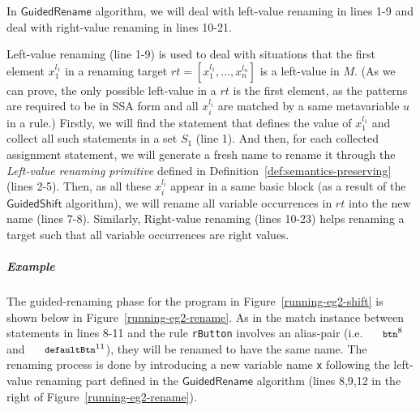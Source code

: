 \documentclass[letterpaper, USenglish]{lipics-v2016}
\newcommand{\code}[1]{\texttt{\footnotesize #1}}
\theoremstyle{plain}
\begin{document}
In $\mathsf{GuidedRename}$ algorithm, we will deal with left-value renaming in lines 1-9 and deal with right-value renaming in lines 10-21. 

Left-value renaming (line 1-9) is used to deal with situations that the first element $x_1^{l_1}$ in a renaming target $\mathit{rt}=[x_{1}^{l_1},...,x_n^{l_n}]$ is a left-value in $M$. (As we can prove, the only possible left-value in a $rt$ is the first element, as the patterns are required to be in SSA form and all $x_i^{l_i}$ are matched by a same metavariable $u$ in a rule.) Firstly, we will find the statement that defines the value of $x_1^{l_1}$ and collect all such statements in a set $S_1$ (line 1). And then, for each collected assignment statement, we will generate a fresh name to rename it through the \emph{Left-value renaming primitive} defined in Definition~\ref{def:semantics-preserving} (lines 2-5). Then, as all these $x_i^{l_i}$ appear in a same basic block (as a result of the $\mathsf{GuidedShift}$ algorithm), we will rename all variable occurrences in $\mathit{rt}$ into the new name (lines 7-8). Similarly, Right-value renaming (lines 10-23) helps renaming a target such that all variable occurrences are right values.


\subparagraph*{Example} The guided-renaming phase for the program in Figure~\ref{running-eg2-shift} is shown below in Figure~\ref{running-eg2-rename}. As in the match instance between statements in lines 8-11 and the rule \code{rButton} involves an alias-pair (i.e. $\code{btn}^8$ and $\code{defaultBtn}^{11}$), they will be renamed to have the same name. The renaming process is done by introducing a new variable name \code{x} following the left-value renaming part defined in the $\mathsf{GuidedRename}$ algorithm (lines 8,9,12 in the right of Figure~\ref{running-eg2-rename}). 
\end{document}
